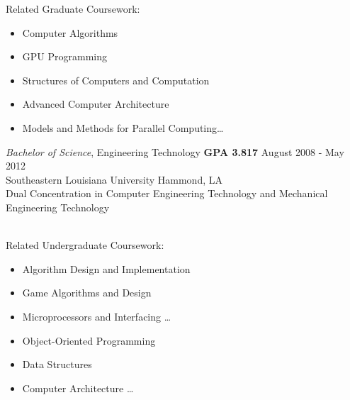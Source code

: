 \documentclass{res}
\begin{document}
\begin{resume}
\begin{multicols}{2}
{		Related Graduate Coursework:  \vspace{-0.175in}
		\begin{itemize}
			\item Computer Algorithms
			\item GPU Programming
			\item Structures of Computers and Computation
			\item Advanced Computer Architecture
			\item Models and Methods for Parallel Computing\ldots
			\end{itemize}
	}
	\end{multicols}

	{\sl Bachelor of Science}, Engineering Technology {\bf GPA 3.817} \hfill August 2008 - May 2012\\
	Southeastern Louisiana University \hfill Hammond, LA\\
	{\footnotesize Dual Concentration in Computer Engineering Technology and Mechanical Engineering Technology}\\\\
		\vspace{-0.49in}
		\begin{multicols}{2}
			{\footnotesize 
				Related Undergraduate Coursework: \vspace{-0.175in}
				\begin{itemize}
					\item Algorithm Design and Implementation
					\item Game Algorithms and Design
					\item Microprocessors and Interfacing \ldots
				\end{itemize} 
				\textvisiblespace %
				\vspace{-0.175in}
				\begin{itemize}
					\item Object-Oriented Programming
					\item Data Structures
					\item Computer Architecture \ldots
				\end{itemize}
			}
		\end{multicols}
		
	

\end{resume}
\end{document}
